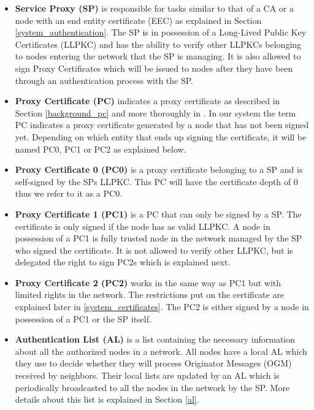 \begin{itemize}
\item \textbf{Service Proxy (SP)} is responsible for tasks similar to that of a CA or a node with an end entity certificate (EEC) as explained in Section \ref{system_authentication}. The SP is in possession of a Long-Lived Public Key Certificates (LLPKC) and has the ability to verify other LLPKCs belonging to nodes entering the network that the SP is managing. It is also allowed to sign Proxy Certificates which will be issued to nodes after they have been through an authentication process with the SP.

\item \textbf{Proxy Certificate (PC)} indicates a proxy certificate as described in Section \ref{background_pc} and more thoroughly in \cite{tuecke2004rfc3820}. In our system the term PC indicates a proxy certificate generated by a node that has not been signed yet. Depending on which entity that ends up signing the certificate, it will be named PC0, PC1 or PC2 as explained below.

\item \textbf{Proxy Certificate 0 (PC0)} is a proxy certificate belonging to a SP and is self-signed by the SPs LLPKC. This PC will have the certificate depth of 0 thus we refer to it as a PC0.

\item \textbf{Proxy Certificate 1 (PC1)} is a PC that can only be signed by a SP. The certificate is only signed if the node has as valid LLPKC. A node in possession of a PC1 is fully trusted node in the network managed by the SP who signed the certificate. It is not allowed to verify other LLPKC, but is delegated the right to sign PC2s which is explained next.

\item \textbf{Proxy Certificate 2 (PC2)} works in the same way as PC1 but with limited rights in the network. The restrictions put on the certificate are explained later in \ref{system_certificates}. The PC2 is either signed by a node in possession of a PC1 or the SP itself.

\item \textbf{Authentication List (AL)} is a list containing the necessary information about all the authorized nodes in a network. All nodes have a local AL which they use to decide whether they will process Originator Messages (OGM) received by neighbors. Their local lists are updated by an AL which is periodically broadcasted to all the nodes in the network by the SP. More details about this list is explained in Section \ref{al}.
\end{itemize}

